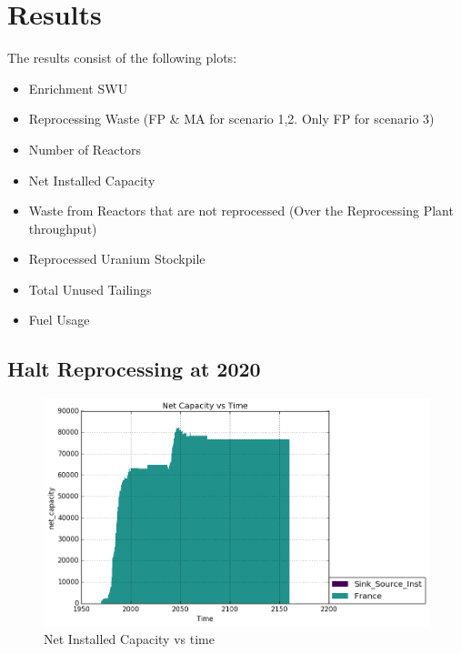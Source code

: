 \section{Results}
The results consist of the following plots:
\begin{itemize}
	\item Enrichment SWU
	\item Reprocessing Waste (\gls{FP} \& \gls{MA} for scenario 1,2. Only \gls{FP} for scenario 3)
	\item Number of Reactors
	\item Net Installed Capacity
	\item Waste from Reactors that are not reprocessed (Over the Reprocessing Plant throughput)
	\item Reprocessed Uranium Stockpile
	\item Total Unused Tailings
	\item Fuel Usage
\end{itemize}
		
		
\subsection{Halt Reprocessing at 2020}

\begin{figure}
	\includegraphics[width=\linewidth]{./images/stoprep_2020/power_plot.png}
	\caption{Net Installed Capacity vs time}
	\label{fig:reprocess_capacity}
\end{figure}

